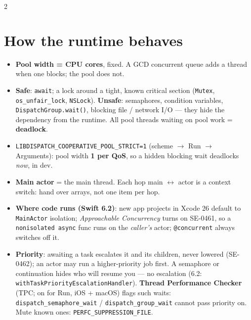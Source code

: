 \documentclass[8pt]{extarticle}
\begin{document}
\begin{multicols}{2}
\raggedright

\section{How the runtime behaves}
\begin{itemize}
  \item \textbf{Pool width = CPU cores}, fixed. A GCD concurrent queue adds a thread when one
        blocks; the pool does not.
  \item \textbf{Safe}: \texttt{await}; a lock around a tight, known critical section
        (\texttt{Mutex}, \texttt{os\_unfair\_lock}, \texttt{NSLock}). \textbf{Unsafe}: semaphores,
        condition variables, \texttt{DispatchGroup.wait()}, blocking file / network I/O — they hide
        the dependency from the runtime. All pool threads waiting on pool work = \textbf{deadlock}.
  \item \texttt{LIBDISPATCH\_COOPERATIVE\_POOL\_STRICT=1} (scheme $\to$ Run $\to$ Arguments):
        pool width \textbf{1 per QoS}, so a hidden blocking wait deadlocks \emph{now}, in dev.
  \item \textbf{Main actor} = the main thread. Each hop main $\leftrightarrow$ actor is a context
        switch: hand over arrays, not one item per hop.
  \item \textbf{Where code runs (Swift 6.2)}: new app projects in Xcode 26 default to
        \texttt{MainActor} isolation; \emph{Approachable Concurrency} turns on SE-0461, so a
        \texttt{nonisolated async} func runs on the \emph{caller's} actor; \texttt{@concurrent}
        always switches off it.
  \item \textbf{Priority}: awaiting a task escalates it and its children, never lowered (SE-0462);
        an actor may run a higher-priority job first. A semaphore or continuation hides who will
        resume you — no escalation (6.2: \texttt{withTaskPriorityEscalationHandler}).
        \textbf{Thread Performance Checker} (TPC; on for Run, iOS + macOS) flags such waits:
        \texttt{dispatch\_semaphore\_wait} / \texttt{dispatch\_group\_wait} cannot pass priority on.
        Mute known ones: \texttt{PERFC\_SUPPRESSION\_FILE}.
\end{itemize}


\end{multicols}
\end{document}
